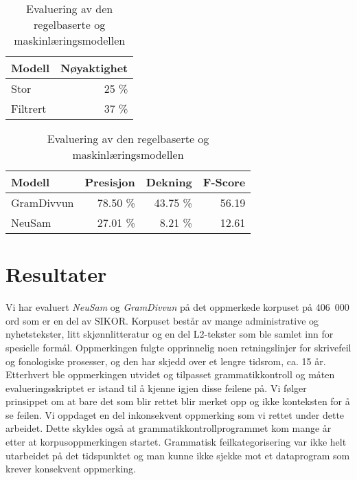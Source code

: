 \documentclass{flammie}
\begin{document}
\begin{table}[htb]
\begin{minipage}{0.45\textwidth}
        \centering
    \begin{tabular}{l|r}
        \bf{Modell} & \bf{Nøyaktighet} \\
        \hline
        Stor & 25 \% \\
        Filtrert & 37 \% \\
    \end{tabular}
    \caption{Nøyaktighet av nevrale modeller
    \label{tab:accuracy}}
    \end{minipage}
    \begin{minipage}{0.45\textwidth}
        \centering
    \begin{tabular}{l|r|r|r}
        \bf{Modell} & \bf{Presisjon} & \bf{Dekning} & \bf{F-Score} \\
        \hline
        GramDivvun & 78.50 \% & 43.75 \% & 56.19 \\
        NeuSam & 27.01 \% & 8.21 \% & 12.61 \\
    \end{tabular}
    \caption{Evaluering av den regelbaserte og maskinlæringsmodellen
    \label{tab:accuracy-ekte}}
    \end{minipage}
\end{table}

\section{Resultater}

Vi har evaluert \textit{NeuSam} og \textit{GramDivvun} på det oppmerkede
korpuset på 406~000 ord som er en del av SIKOR.  Korpuset består av mange
administrative og nyhetstekster, litt skjønnlitteratur og en del L2-tekster som
ble samlet inn for spesielle formål. Oppmerkingen fulgte opprinnelig noen
retningslinjer for skrivefeil og fonologiske prosesser, og den har skjedd over
et lengre tidsrom, ca. 15 år.  Etterhvert ble oppmerkingen utvidet og tilpasset
grammatikkontroll og måten evalueringsskriptet er istand til å kjenne igjen
disse feilene på.  Vi følger prinsippet om at bare det som blir rettet blir
merket opp og ikke konteksten for å se feilen.  Vi oppdaget en del inkonsekvent
oppmerking som vi rettet under dette arbeidet. Dette skyldes også at
grammatikkontrollprogrammet kom mange år etter at korpusoppmerkingen startet.
Grammatisk feilkategorisering var ikke helt utarbeidet på det tidspunktet og man
kunne ikke sjekke mot et dataprogram som krever konsekvent oppmerking.
\end{document}
